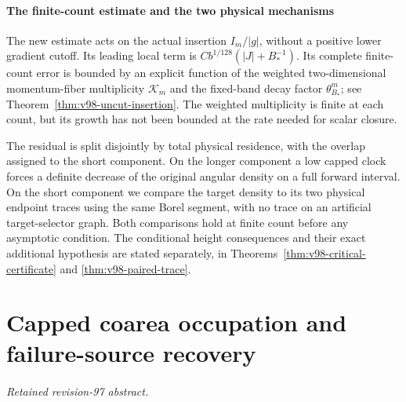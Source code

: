 \documentclass[11pt,reqno]{amsart}
\numberwithin{equation}{section}
\theoremstyle{definition}\newtheorem{definition}[theorem]{Definition}
\theoremstyle{remark}\newtheorem{remark}[theorem]{Remark}
\theoremstyle{definition}\newtheorem{inputstatement}[theorem]{Input statement}
\begin{document}


\subsection{The finite-count estimate and the two physical mechanisms}
The new estimate acts on the actual insertion $I_m/|g|$, without a
positive lower gradient cutoff. Its leading local term is
$C b^{1/128}(|J|+B_*^{-1})$. Its complete finite-count error is
bounded by an explicit function of the weighted two-dimensional
momentum-fiber multiplicity $\mathcal K_m$ and the fixed-band decay
factor $\theta_{B_*}^m$; see Theorem~\ref{thm:v98-uncut-insertion}.
The weighted multiplicity is finite at each count, but its growth has
not been bounded at the rate needed for scalar closure.

The residual is split disjointly by total physical residence, with the
overlap assigned to the short component. On the longer component a
low capped clock forces a definite decrease of the original angular
density on a full forward interval. On the short component we compare
the target density to its two physical endpoint traces using the same
Borel segment, with no trace on an artificial target-selector graph.
Both comparisons hold at finite count before any asymptotic condition.
The conditional height consequences and their exact additional
hypothesis are stated separately, in Theorems~\ref{thm:v98-critical-certificate}
and \ref{thm:v98-paired-trace}.







\appendix


\endgroup
\part{Capped coarea occupation and failure-source recovery}
\begingroup
\let\ArchiveLabel\label
\let\ArchiveRef\ref
\renewcommand{\label}[1]{\ArchiveLabel{v97archive:#1}}
\renewcommand{\ref}[1]{%
  \IfBeginWith{#1}{supp-}{%
    \StrBehind{#1}{supp-}[\ArchiveTarget]%
    \ArchiveRef{\ArchiveTarget}%
  }{\ArchiveRef{v97archive:#1}}%
}
\makeatletter
\let\ltx@label\label
\makeatother
\paragraph{Retained revision-97 abstract.}
\end{document}
